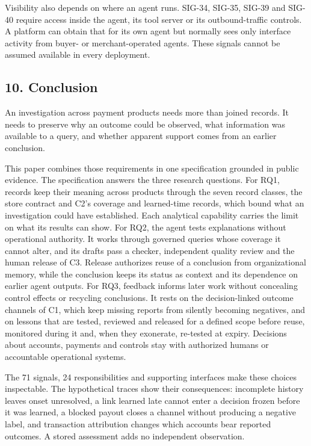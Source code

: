 \documentclass[
  11pt,
]{article}
\begin{document}
Visibility also depends on where an agent runs. \mbox{SIG-34},
\mbox{SIG-35}, \mbox{SIG-39} and \mbox{SIG-40} require access inside the
agent, its tool server or its outbound-traffic controls. A platform can
obtain that for its own agent but normally sees only interface activity
from buyer- or merchant-operated agents. These signals cannot be assumed
available in every deployment.

\FloatBarrier

\hypertarget{conclusion}{%
\subsection{10. Conclusion}\label{conclusion}}

\suppressfloats[t]

An investigation across payment products needs more than joined records.
It needs to preserve why an outcome could be observed, what information
was available to a query, and whether apparent support comes from an
earlier conclusion.

This paper combines those requirements in one specification grounded in
public evidence. The specification answers the three research questions.
For RQ1, records keep their meaning across products through the seven
record classes, the store contract and C2's coverage and learned-time
records, which bound what an investigation could have established. Each
analytical capability carries the limit on what its results can show.
For RQ2, the agent tests explanations without operational authority. It
works through governed queries whose coverage it cannot alter, and its
drafts pass a checker, independent quality review and the human release
of C3. Release authorizes reuse of a conclusion from organizational
memory, while the conclusion keeps its status as context and its
dependence on earlier agent outputs. For RQ3, feedback informs later
work without concealing control effects or recycling conclusions. It
rests on the decision-linked outcome channels of C1, which keep missing
reports from silently becoming negatives, and on lessons that are
tested, reviewed and released for a defined scope before reuse,
monitored during it and, when they exonerate, re-tested at expiry.
Decisions about accounts, payments and controls stay with authorized
humans or accountable operational systems.

The 71 signals, 24 responsibilities and supporting interfaces make these
choices inspectable. The hypothetical traces show their consequences:
incomplete history leaves onset unresolved, a link learned late cannot
enter a decision frozen before it was learned, a blocked payout closes a
channel without producing a negative label, and transaction attribution
changes which accounts bear reported outcomes. A stored assessment adds
no independent observation.
\end{document}
